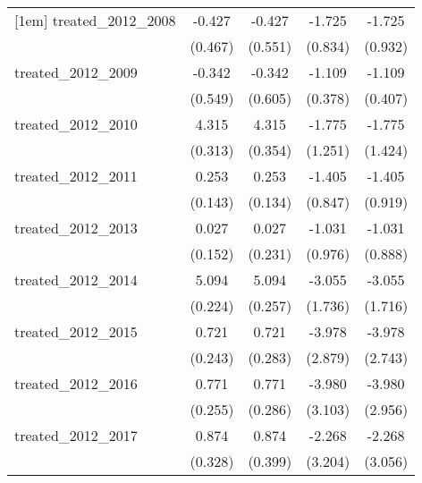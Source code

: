 {\begin{tabular}{l*{4}{c}}
[1em]
treated\_2012\_2008&      -0.427         &      -0.427         &      -1.725\sym{*}  &      -1.725         \\
            &     (0.467)         &     (0.551)         &     (0.834)         &     (0.932)         \\
[1em]
treated\_2012\_2009&      -0.342         &      -0.342         &      -1.109\sym{**} &      -1.109\sym{**} \\
            &     (0.549)         &     (0.605)         &     (0.378)         &     (0.407)         \\
[1em]
treated\_2012\_2010&       4.315\sym{***}&       4.315\sym{***}&      -1.775         &      -1.775         \\
            &     (0.313)         &     (0.354)         &     (1.251)         &     (1.424)         \\
[1em]
treated\_2012\_2011&       0.253         &       0.253         &      -1.405         &      -1.405         \\
            &     (0.143)         &     (0.134)         &     (0.847)         &     (0.919)         \\
[1em]
treated\_2012\_2013&       0.027         &       0.027         &      -1.031         &      -1.031         \\
            &     (0.152)         &     (0.231)         &     (0.976)         &     (0.888)         \\
[1em]
treated\_2012\_2014&       5.094\sym{***}&       5.094\sym{***}&      -3.055         &      -3.055         \\
            &     (0.224)         &     (0.257)         &     (1.736)         &     (1.716)         \\
[1em]
treated\_2012\_2015&       0.721\sym{**} &       0.721\sym{*}  &      -3.978         &      -3.978         \\
            &     (0.243)         &     (0.283)         &     (2.879)         &     (2.743)         \\
[1em]
treated\_2012\_2016&       0.771\sym{**} &       0.771\sym{**} &      -3.980         &      -3.980         \\
            &     (0.255)         &     (0.286)         &     (3.103)         &     (2.956)         \\
[1em]
treated\_2012\_2017&       0.874\sym{**} &       0.874\sym{*}  &      -2.268         &      -2.268         \\
            &     (0.328)         &     (0.399)         &     (3.204)         &     (3.056)         \\

\end{tabular}}
